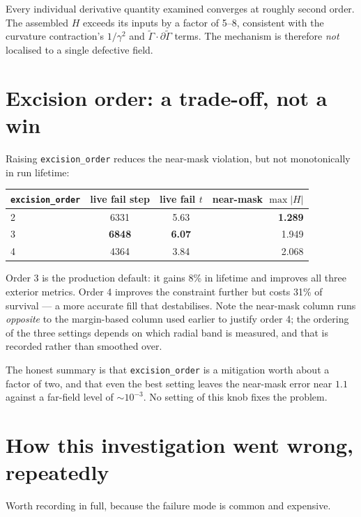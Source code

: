 \documentclass[11pt,openany]{book}
\begin{document}
Every individual derivative quantity examined converges at roughly second
order. The assembled $H$ exceeds its inputs by a factor of 5--8, consistent
with the curvature contraction's $1/\gamma^2$ and $\tilde{\Gamma}\cdot
\partial\tilde{\Gamma}$ terms. The mechanism is therefore \emph{not} localised
to a single defective field.

\section{Excision order: a trade-off, not a win}

Raising \texttt{excision\_order} reduces the near-mask violation, but not
monotonically in run lifetime:

\begin{center}
\begin{tabular}{@{}lccr@{}}
\toprule
\texttt{excision\_order} & live fail step & live fail $t$ & near-mask $\max|H|$ \\
\midrule
2 & 6331 & 5.63 & \textbf{1.289} \\
3 & \textbf{6848} & \textbf{6.07} & 1.949 \\
4 & 4364 & 3.84 & 2.068 \\
\bottomrule
\end{tabular}
\end{center}

Order 3 is the production default: it gains 8\% in lifetime and improves all
three exterior metrics. Order 4 improves the constraint further but costs
31\% of survival --- a more accurate fill that destabilises. Note the near-mask
column runs \emph{opposite} to the margin-based column used earlier to justify
order 4; the ordering of the three settings depends on which radial band is
measured, and that is recorded rather than smoothed over.

The honest summary is that \texttt{excision\_order} is a mitigation worth about
a factor of two, and that even the best setting leaves the near-mask error near
$1.1$ against a far-field level of $\sim10^{-3}$. No setting of this knob fixes
the problem.

\section{How this investigation went wrong, repeatedly}

Worth recording in full, because the failure mode is common and expensive.
\end{document}

